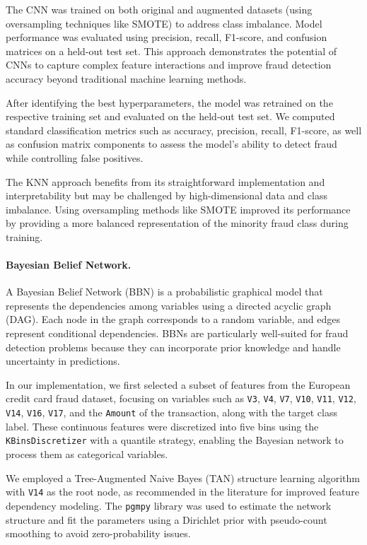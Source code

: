 \documentclass{article}
\begin{document}
The CNN was trained on both original and augmented datasets (using oversampling techniques like SMOTE) to address class imbalance. Model performance was evaluated using precision, recall, F1-score, and confusion matrices on a held-out test set. This approach demonstrates the potential of CNNs to capture complex feature interactions and improve fraud detection accuracy beyond traditional machine learning methods.

After identifying the best hyperparameters, the model was retrained on the respective training set and evaluated on the held-out test set. We computed standard classification metrics such as accuracy, precision, recall, F1-score, as well as confusion matrix components to assess the model’s ability to detect fraud while controlling false positives.

The KNN approach benefits from its straightforward implementation and interpretability but may be challenged by high-dimensional data and class imbalance. Using oversampling methods like SMOTE improved its performance by providing a more balanced representation of the minority fraud class during training.

\paragraph{Bayesian Belief Network.}
A Bayesian Belief Network (BBN) is a probabilistic graphical model that represents the dependencies among variables using a directed acyclic graph (DAG). Each node in the graph corresponds to a random variable, and edges represent conditional dependencies. BBNs are particularly well-suited for fraud detection problems because they can incorporate prior knowledge and handle uncertainty in predictions.


In our implementation, we first selected a subset of features from the European credit card fraud dataset, focusing on variables such as \texttt{V3}, \texttt{V4}, \texttt{V7}, \texttt{V10}, \texttt{V11}, \texttt{V12}, \texttt{V14}, \texttt{V16}, \texttt{V17}, and the \texttt{Amount} of the transaction, along with the target class label. These continuous features were discretized into five bins using the \texttt{KBinsDiscretizer} with a quantile strategy, enabling the Bayesian network to process them as categorical variables.

We employed a Tree-Augmented Naive Bayes (TAN) structure learning algorithm with \texttt{V14} as the root node, as recommended in the literature for improved feature dependency modeling. The \texttt{pgmpy} library was used to estimate the network structure and fit the parameters using a Dirichlet prior with pseudo-count smoothing to avoid zero-probability issues.
\end{document}
